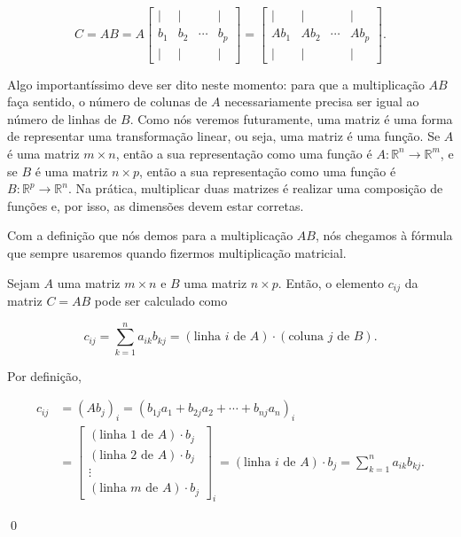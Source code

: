 $$
C = AB = A\begin{bmatrix}
	| & | & & | \\
	b_1 & b_2 & \cdots & b_p \\
	| & | & & |
\end{bmatrix} = \begin{bmatrix}
	| & | & & | \\
	Ab_1 & Ab_2 & \cdots & Ab_p \\
	| & | & & |
\end{bmatrix}.
$$

Algo importantíssimo deve ser dito neste momento: para que a multiplicação $AB$ faça sentido, o número de colunas de $A$ necessariamente precisa ser igual ao número de linhas de $B$. Como nós veremos futuramente, uma matriz é uma forma de representar uma transformação linear, ou seja, uma matriz é uma função. Se $A$ é uma matriz $m\times n$, então a sua representação como uma função é $A:\mathbb{R}^n\to\mathbb{R}^m$, e se $B$ é uma matriz $n\times p$, então a sua representação como uma função é $B:\mathbb{R}^p\to\mathbb{R}^n$. Na prática, multiplicar duas matrizes é realizar uma composição de funções e, por isso, as dimensões devem estar corretas.

Com a definição que nós demos para a multiplicação $AB$, nós chegamos à fórmula que sempre usaremos quando fizermos multiplicação matricial.

\begin{Theorem}
	Sejam $A$ uma matriz $m\times n$ e $B$ uma matriz $n\times p$. Então, o elemento $c_{ij}$ da matriz $C = AB$ pode ser calculado como
	
	$$
	c_{ij} = \sum\limits_{k = 1}^{n} a_{ik}b_{kj} = (\text{linha $i$ de $A$})\cdot(\text{coluna $j$ de $B$}).
	$$
\end{Theorem}

\begin{Proof}
	Por definição, 
	
	$$
	\begin{aligned}
		c_{ij} &= (Ab_j)_i = (b_{1j}a_1 + b_{2j}a_2 + \cdots + b_{nj}a_n)_i \\
		&= \begin{bmatrix}
			(\text{linha $1$ de $A$})\cdot b_j \\
			(\text{linha $2$ de $A$})\cdot b_j \\
			\vdots \\
			(\text{linha $m$ de $A$})\cdot b_j
		\end{bmatrix}_i = (\text{linha $i$ de $A$})\cdot b_j = \sum\limits_{k = 1}^{n} a_{ik}b_{kj}.
	\end{aligned}
	$$
	
	\qed
\end{Proof}

